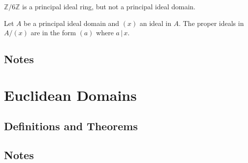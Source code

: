 \begin{exmbox}
    \begin{example}
        \(\mathbb{Z}/6\mathbb{Z}\) is a principal ideal ring, but not a principal ideal domain.
    \end{example}
\end{exmbox}

\begin{thmbox}
    \begin{proposition}
        Let \(A\) be a principal ideal domain and \((x)\) an ideal in \(A\). The proper ideals in \(A / (x)\) are in the form \((a)\) where \(a \, | \, x\). 
    \end{proposition}
\end{thmbox}

\subsection*{Notes}

\newpage
\section{Euclidean Domains}
\subsection*{Definitions and Theorems}
\subsection*{Notes}